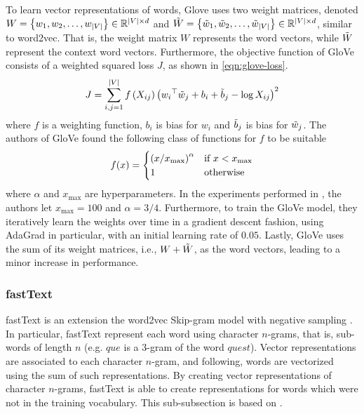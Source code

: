 To learn vector representations of words, Glove uses two weight matrices, denoted $W=\left\{w_1, w_2, \ldots, w_{|V|}\right\} \in \mathbb{R}^{|V| \times d}$ and $\Tilde{W}=\left\{\Tilde{w}_1, \Tilde{w}_2, \ldots, \Tilde{w}_{|V|}\right\} \in \mathbb{R}^{|V| \times d}$, similar to word2vec. That is, the weight matrix $W$ represents the word vectors, while $\Tilde{W}$ represent the context word vectors. Furthermore, the objective function of GloVe consists of a weighted squared loss $J$, as shown in \cref{eqn:glove-loss}.
\begin{align}
    J = \sum\limits_{i, j = 1}^{|V|} f \left(X_{ij}\right) \left({w_i}^\top \Tilde{w}_j + b_i + \Tilde{b}_j - \log X_{ij}\right)^2
    \label{eqn:glove-loss}
\end{align}
where $f$ is a weighting function, $b_i$ is bias for $w_i$ and $\Tilde{b}_j$ is bias for $\Tilde{w}_j$. The authors of GloVe found the following class of functions for $f$ to be suitable
\begin{align}
    f(x) = \begin{cases}
        \left(x / x_{\text{max}}\right)^\alpha & \mbox{if } x < x_{\text{max}} \\
        1 & \text{otherwise}
    \end{cases}
    \label{eqn:glove-loss-f-function}
\end{align}
where $\alpha$ and $x_{\text{max}}$ are hyperparameters. In the experiments performed in \cite{pennington2014glove}, the authors let $x_{\text{max}}=100$ and $\alpha=3/4$. Furthermore, to train the GloVe model, they iteratively learn the weights over time in a gradient descent fashion, using AdaGrad \cite{Duchi2011} in particular, with an initial learning rate of $0.05$. Lastly, GloVe uses the sum of its weight matrices, i.e., $W + \Tilde{W}$, as the word vectors, leading to a minor increase in performance.

\subsubsection{fastText}
fastText is an extension the word2vec Skip-gram model with negative sampling \cite{bojanowski2017enriching}. In particular, fastText represent each word using character $n$-grams, that is, sub-words of length $n$ (e.g. $\textit{que}$ is a $3$-gram of the word $\textit{quest}$). Vector representations are associated to each character $n$-gram, and following, words are vectorized using the sum of such representations. By creating vector representations of character $n$-grams, fastText is able to create representations for words which were not in the training vocabulary. This sub-subsection is based on \cite{bojanowski2017enriching}.

